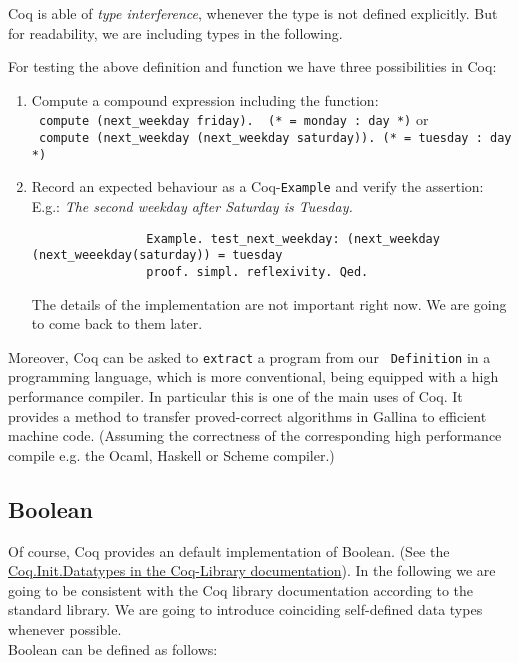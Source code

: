   Coq is able of {\itshape type  interference}, whenever the type is not defined explicitly.
  But for readability, we are including types in the following.
   
  For testing the above definition and function we have three possibilities in Coq:
     
   \begin{enumerate}
   \item Compute a compound expression including the function:\\
 		 \lstinline! compute (next_weekday friday).  (* = monday : day *)! or \\
   		 \lstinline! compute (next_weekday (next_weekday saturday)). (* = tuesday : day *)!
   \item Record an expected behaviour as a Coq-\lstinline!Example! and verify the assertion: 
         E.g.: {\itshape The second weekday after Saturday is Tuesday.}  
   
		   \begin{lstlisting}
		   		Example. test_next_weekday: (next_weekday (next_weeekday(saturday)) = tuesday 
		   		proof. simpl. reflexivity. Qed.
		   \end{lstlisting}
   			The details of the implementation are not important right now. We are going to come back to them later.
   \end{enumerate}   

    Moreover, Coq can be asked to \lstinline!extract! a program from our \lstinline! Definition! in a programming language, which is more conventional, being equipped with a high performance compiler.
    In particular this is one of the main uses of Coq. 
    It provides a method to transfer proved-correct algorithms in Gallina to efficient machine code.
    (Assuming the correctness of the corresponding high performance compile e.g. the Ocaml, Haskell or Scheme compiler.) 


\subsection{Boolean}

    Of course, Coq provides an default implementation of Boolean.
    (See the \newline \href{https://www.cs.princeton.edu/courses/archive/fall07/cos595/stdlib/html/Coq.Init.Datatypes.html}{Coq.Init.Datatypes in the Coq-Library documentation}).  
    In the following we are going to be consistent with the Coq library documentation according to the standard library.
    We are going to introduce coinciding self-defined data types whenever possible.\\
    Boolean can be defined as follows:
    
